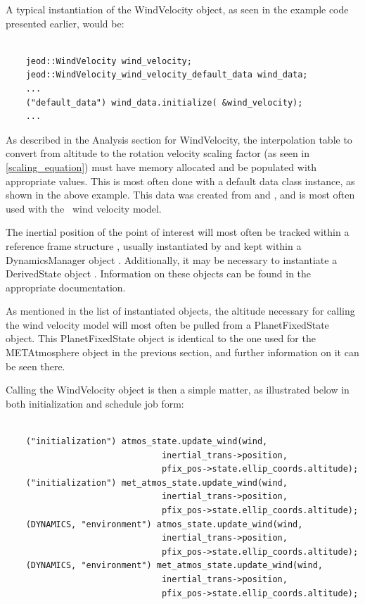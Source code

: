 A typical instantiation of the WindVelocity object, as seen in the example code
presented earlier, would be:

\begin{verbatim}

    jeod::WindVelocity wind_velocity;
    jeod::WindVelocity_wind_velocity_default_data wind_data;
    ...
    ("default_data") wind_data.initialize( &wind_velocity);
    ...

\end{verbatim}

As described in the Analysis section for WindVelocity, the interpolation table
to convert from altitude to the rotation velocity scaling factor (as seen in
\eqref{scaling_equation}) must have memory allocated and be populated with
appropriate values. This is most often done with a default data class instance, as
shown in the above example. This data was created from \cite{King} and
\cite{Zarrouati}, and is most often used with the \JEODid\ wind velocity model.

The inertial position of the point of interest will most often be tracked within
a reference frame structure \cite{dynenv:REFFRAMES}, usually instantiated by
and kept within a DynamicsManager object \cite{dynenv:DYNMANAGER}. Additionally,
it may be necessary to instantiate a DerivedState object
\cite{dynenv:DERIVEDSTATE}. Information on these objects can be found in the
appropriate documentation.

As mentioned in the list of instantiated objects, the altitude necessary for
calling the wind velocity model will most often be pulled from a PlanetFixedState
object. This PlanetFixedState object is identical to the one used for the
METAtmosphere object in the previous section, and further information on it can
be seen there.

Calling the WindVelocity object is then a simple matter, as illustrated
below in both initialization and schedule job form:

\begin{verbatim}

    ("initialization") atmos_state.update_wind(wind,
                               inertial_trans->position,
                               pfix_pos->state.ellip_coords.altitude);
    ("initialization") met_atmos_state.update_wind(wind,
                               inertial_trans->position,
                               pfix_pos->state.ellip_coords.altitude);
    (DYNAMICS, "environment") atmos_state.update_wind(wind,
                               inertial_trans->position,
                               pfix_pos->state.ellip_coords.altitude);
    (DYNAMICS, "environment") met_atmos_state.update_wind(wind,
                               inertial_trans->position,
                               pfix_pos->state.ellip_coords.altitude);

\end{verbatim}

